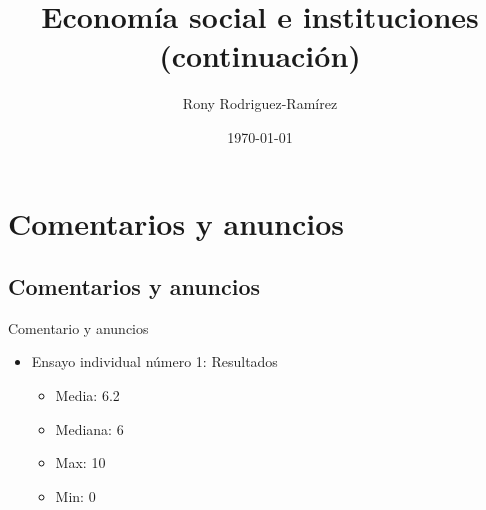 \documentclass[11pt, aspectratio=169, compress]{beamer}
\title{Economía social e instituciones (continuación)}
\author{Rony Rodriguez-Ramírez}
\institute{Economía Social y Humana | Grupo B018 \\Universidad Centroamericana}
\date{\today}
\begin{document}
	
\begin{frame}[plain]
	\maketitle  
\end{frame}

\section{Comentarios y anuncios}
\subsection{Comentarios y anuncios}
\begin{frame}{Comentario y anuncios}
\begin{itemize}
	\item Ensayo individual número 1: Resultados
	\begin{itemize}
		\item Media: 6.2 
		\item Mediana: 6 
		\item Max: 10 
		\item Min: 0
	\end{itemize}
\end{itemize}
\end{frame}
\end{document}
